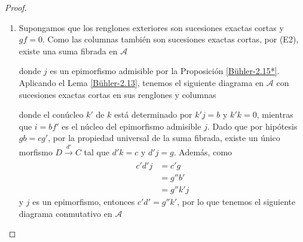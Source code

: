 \documentclass[tesis]{subfiles}
\begin{document}
\begin{proof}
\begin{enumerate}[label=(\alph*)]
         \item Supongamos que los renglones exteriores son sucesiones exactas cortas y $gf=0$. Como las columnas también son sucesiones exactas cortas, por (E2), existe una suma fibrada en $\mathscr{A}$
             \begin{center}
             \end{center}
             donde $j$ es un epimorfismo admisible por la Proposición \ref{Bühler-2.15*}. Aplicando el Lema \ref{Bühler-2.13}, tenemos el siguiente diagrama en $\mathscr{A}$ con sucesiones exactas cortas en sus renglones y columnas
             \begin{center}
             \end{center}
             donde el conúcleo $k'$ de $k$ está determinado por $k'j=b$ y $k'k=0$, mientras que $i=bf'$ es el núcleo del epimorfismo admisible $j$. Dado que por hipótesis $gb=cg'$, por la propiedad universal de la suma fibrada, existe un único morfismo $D\xrightarrow[]{d'}C$ tal que $d'k=c$ y $d'j=g$. Además, como
             \begin{align*}
                 c'd'j &= c'g \\
                       &= g''b' \\
                       &= g''k'j
             \end{align*}
             y $j$ es un epimorfismo, entonces $c'd'=g''k'$, por lo que tenemos el siguiente diagrama conmutativo en $\mathscr{A}$
             \begin{equation}\label{eq: Bühler-3.6-1}

\end{equation}
\end{enumerate}
\end{proof}
\end{document}
